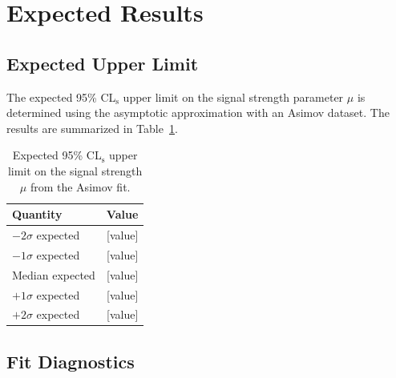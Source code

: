 
\section{Expected Results}
\label{sec:expected}


\subsection{Expected Upper Limit}
\label{sec:expected:limit}


The expected 95\% CL$_\text{s}$ upper limit on the signal strength parameter
$\mu$ is determined using the asymptotic approximation with an Asimov dataset.
The results are summarized in Table~\ref{tab:expected_limit}.

\begin{table}[htbp]
  \centering
  \caption{Expected 95\% CL$_\text{s}$ upper limit on the signal strength
           $\mu$ from the Asimov fit.}
  \label{tab:expected_limit}
  \begin{tabular}{lr}
    \toprule
    Quantity & Value \\
    \midrule
    $-2\sigma$ expected & [value] \\
    $-1\sigma$ expected & [value] \\
    Median expected     & [value] \\
    $+1\sigma$ expected & [value] \\
    $+2\sigma$ expected & [value] \\
    \bottomrule
  \end{tabular}
\end{table}

\subsection{Fit Diagnostics}
\label{sec:expected:diagnostics}


